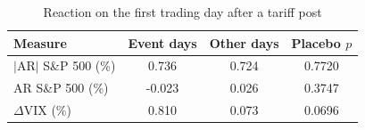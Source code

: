 \begin{table}[H]
\centering
\caption{Reaction on the first trading day after a tariff post}
\label{tab:event}
\begin{tabular}{lccc}
\toprule
Measure & Event days & Other days & Placebo $p$ \\
\midrule
$|$AR$|$ S\&P 500 (\%) & 0.736 & 0.724 & 0.7720 \\
AR S\&P 500 (\%) & -0.023 & 0.026 & 0.3747 \\
$\Delta$VIX (\%) & 0.810 & 0.073 & 0.0696 \\
\bottomrule
\end{tabular}
\end{table}
